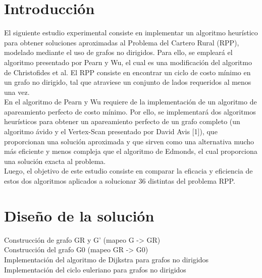 \documentclass[11pt]{article}
\begin{document}
                                                               
\newpage
                                                    
\section{Introducción}

El siguiente estudio experimental consiste en implementar un algoritmo heurístico para
obtener soluciones aproximadas al Problema del Cartero Rural (RPP), modelado mediante el uso 
de grafos no dirigidos. Para ello, se empleará el algoritmo presentado por Pearn y Wu, el
cual es una modificación del algoritmo de Christofides et al. El RPP consiste en encontrar 
un ciclo de costo mínimo en un grafo no dirigido, tal que atraviese un conjunto de lados 
requeridos al menos una vez. \\

En el algoritmo de Pearn y Wu requiere de la implementación de un algoritmo de apareamiento 
perfecto de costo mínimo. Por ello, se implementará dos algoritmos heurísticos para obtener 
un apareamiento perfecto de un grafo completo (un algoritmo ávido y el Vertex-Scan presentado
por David Avis [1]), que proporcionan una solución aproximada y que sirven como una alternativa
mucho más eficiente y menos compleja que el algoritmo de Edmonds, el cual proporciona una 
solución exacta al problema. \\

Luego, el objetivo de este estudio consiste en comparar la eficacia y eficiencia de estos
dos algoritmos aplicados a solucionar 36 distintas del problema RPP. \\

\section{Diseño de la solución}

Construcción de grafo GR y G' (mapeo G -> GR) \\

Construcción del grafo G0 (mapeo GR -> G0) \\

Implementación del algoritmo de Dijkstra para grafos no dirigidos\\

Implementación del ciclo euleriano para grafos no dirigidos\\
\end{document}
